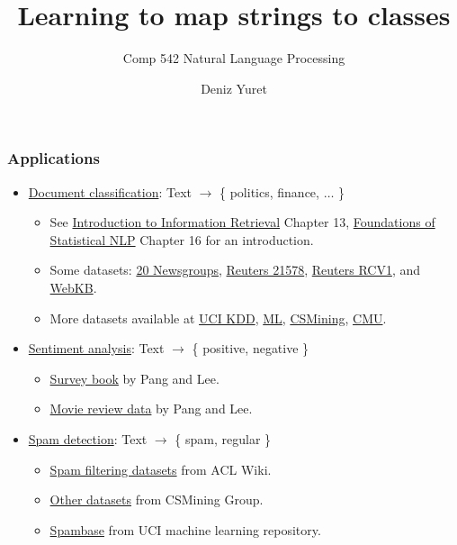 \documentclass[ignorenonframetext,plain]{beamer}
\title{Learning to map strings to classes}
\subtitle{Comp 542 Natural Language Processing}
\author{Deniz Yuret}
\begin{document}
\begin{frame}
\maketitle
\end{frame}

\begin{frame}\frametitle{Applications}
\begin{itemize}
\item
  \href{http://en.wikipedia.org/wiki/Document_classification}{Document
    classification}: Text $\rightarrow$ \{ politics, finance, $\dots$ \}
\begin{itemize}
\item See \href{http://www-nlp.stanford.edu/IR-book}{Introduction to
  Information Retrieval} Chapter 13,
  \href{http://nlp.stanford.edu/fsnlp}{Foundations of Statistical NLP}
  Chapter 16 for an introduction.
\item Some datasets: \href{http://qwone.com/~jason/20Newsgroups}{20 Newsgroups},
  \href{http://www.daviddlewis.com/resources/testcollections/reuters21578}{Reuters
    21578}, 
  \href{http://www.ai.mit.edu/projects/jmlr/papers/volume5/lewis04a/lyrl2004_rcv1v2_README.htm}{Reuters
    RCV1}, and \href{http://www.cs.cmu.edu/~webkb/}{WebKB}.
\item More datasets available at \href{http://kdd.ics.uci.edu}{UCI
  KDD}, \href{http://archive.ics.uci.edu/ml/index.html}{ML},
  \href{http://csmining.org/index.php/data.html}{CSMining},
  \href{http://www.cs.cmu.edu/~TextLearning/datasets.html}{CMU}.
\end{itemize}
\item \href{http://en.wikipedia.org/wiki/Sentiment_analysis}{Sentiment
  analysis}: Text $\rightarrow$ \{ positive, negative \}
\begin{itemize}
\item
  \href{http://www.cs.cornell.edu/home/llee/opinion-mining-sentiment-analysis-survey.html}{Survey
    book} by Pang and Lee.
\item
  \href{http://www.cs.cornell.edu/people/pabo/movie-review-data}{Movie
    review data} by Pang and Lee.
\end{itemize}
\item \href{http://en.wikipedia.org/wiki/Anti-spam_techniques}{Spam
  detection}: Text $\rightarrow$ \{ spam, regular \}
\begin{itemize}
\item
  \href{http://www.aclweb.org/aclwiki/index.php?title=Spam_filtering_datasets}{Spam
  filtering datasets} from ACL Wiki.
\item \href{http://csmining.org/index.php/data.html}{Other datasets} from
  CSMining Group.
\item \href{http://archive.ics.uci.edu/ml/datasets/Spambase}{Spambase}
  from UCI machine learning repository.
\end{itemize}
\end{itemize}
\end{frame}
\end{document}
